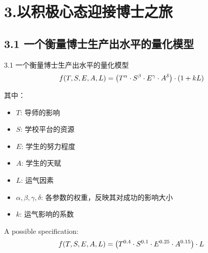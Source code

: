 \documentclass[10pt,aspectratio=43,mathserif,table]{beamer}
\begin{document}
\section{3.以积极心态迎接博士之旅}  %
\subsection{3.1 一个衡量博士生产出水平的量化模型}
\begin{frame}{\small 3.1 一个衡量博士生产出水平的量化模型}
	$$
	\small f(T, S, E, A, L) = \left( T^{\alpha} \cdot S^{\beta} \cdot E^{\gamma} \cdot A^{\delta} \right) \cdot (1 + kL)
	$$
	
	\small 其中：
	\begin{itemize}
		\item \footnotesize $T$: 导师的影响
		\item \footnotesize $S$: 学校平台的资源
		\item \footnotesize $E$: 学生的努力程度
		\item \footnotesize $A$: 学生的天赋
		\item \footnotesize $L$: 运气因素
		\item \footnotesize $\alpha, \beta, \gamma, \delta$: 各参数的权重，反映其对成功的影响大小
		\item \footnotesize $k$: 运气影响的系数
	\end{itemize}
	
	\vspace{2em}
	
	\small A possible specification:
	$$
	\small f(T, S, E, A, L) = \left( T^{0.4} \cdot S^{0.1} \cdot E^{0.25} \cdot A^{0.15} \right) \cdot L
	$$
\end{frame}
\end{document}
